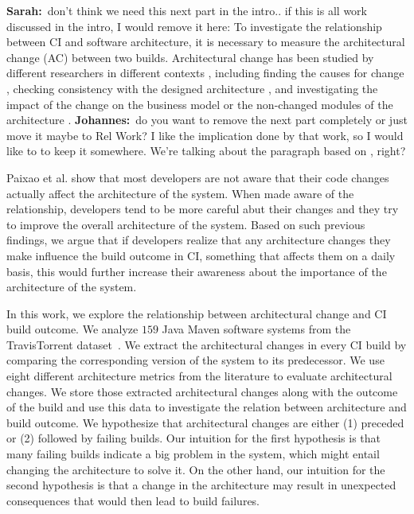 \documentclass[sigplan, anonymous, review]{acmart}
\newcommand{\sn}[1]{{\color{blue}\textbf{Sarah:}~#1}}
\newcommand{\jk}[1]{{\color{violet}\textbf{Johannes:}~#1}}
\begin{document}
\sn{don't think we need this next part in the intro.. if this is all work discussed in the intro, I would remove it here: To investigate the relationship between CI and software architecture, it is necessary to measure the architectural change (AC) between two builds. Architectural change has been studied by different researchers in different contexts \cite{Aramis,StructDist,Arc-MDSE,Arcade-Base}, including  finding the causes for change \cite{AC-Causes}, checking consistency with the designed architecture \cite{ArcConf, ArcCons}, and investigating the impact of the change on the business model \cite{ArcChange-Business} or the non-changed modules of the architecture \cite{Knowledge-AC}. } \jk{do you want to remove the next part completely or just move it maybe to Rel Work? I like the implication done by that work, so I would like to to keep it somewhere. We're talking about the paragraph based on \cite{ImpactAwareness}, right?}

Paixao et al. \cite{ImpactAwareness} show that most developers are not aware that their code changes actually affect the architecture of the system. When made aware of the relationship, developers tend to be more careful abut their changes and they try to improve the overall architecture of the system.
Based on such previous findings, we argue that if developers realize that any architecture changes they make influence the build outcome in CI, something that affects them on a daily basis, this would further increase their awareness about the importance of the architecture of the system.

In this work, we explore the relationship between architectural change and CI build outcome.
We analyze $159$ Java Maven software systems from the TravisTorrent dataset~\cite{TravisTorrent}. 
We extract the architectural changes in every CI build by comparing the corresponding version of the system to its predecessor.
We use eight different architecture metrics from the literature to evaluate architectural changes.  
We store those extracted architectural changes along with the outcome of the build and use this data to investigate the relation between architecture and build outcome.
We hypothesize that architectural changes are either (1) preceded or (2) followed by failing builds. 
Our intuition for the first hypothesis is that many failing builds indicate a big problem in the system, which might entail changing the architecture to solve it. 
On the other hand, our intuition for the second hypothesis is that a change in the architecture may result in unexpected consequences that would then lead to build failures.
\end{document}
